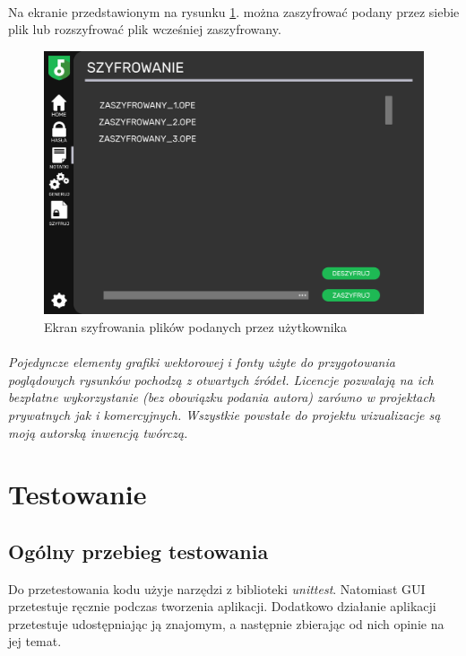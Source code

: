 \documentclass[a4paper]{article}
\begin{document}
\newpage

\paragraph{}Na ekranie przedstawionym na rysunku \ref{fig:szyfrowanie}. można zaszyfrować podany przez siebie plik lub rozszyfrować plik wcześniej zaszyfrowany.
\begin{figure}[H]
    \centering
    \includegraphics[width=1\textwidth]{img/ekran_szyfrowania.png}
    \caption{Ekran szyfrowania plików podanych przez użytkownika}
    \label{fig:szyfrowanie}
\end{figure}

\paragraph{}\textit{Pojedyncze elementy grafiki wektorowej i fonty użyte do przygotowania poglądowych rysunków pochodzą z otwartych źródeł. Licencje pozwalają na ich bezpłatne wykorzystanie (bez obowiązku podania autora) zarówno w projektach prywatnych jak i komercyjnych. Wszystkie powstałe do projektu wizualizacje są moją autorską inwencją twórczą.}

\section{Testowanie}
\subsection{Ogólny przebieg testowania}
Do przetestowania kodu użyje narzędzi z biblioteki \textit{unittest}. Natomiast GUI przetestuje ręcznie podczas tworzenia aplikacji. Dodatkowo działanie aplikacji przetestuje udostępniając ją znajomym, a następnie zbierając od nich opinie na jej temat.
\label{end}
\end{document}
